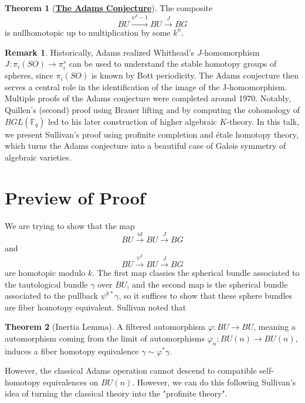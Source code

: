 \documentclass{article}
\theoremstyle{definition}
\newtheorem{theorem}{Theorem}[section]
\theoremstyle{definition}
\theoremstyle{definition}
\newtheorem{remark}{Remark}[theorem]
\theoremstyle{definition}
\theoremstyle{definition}
\theoremstyle{definition}
\theoremstyle{definition}
\begin{document}
	\begin{tcolorbox}[colback=red!5!white,colframe=red!30!white]
	\begin{theorem}[\underline{\textbf{The Adams Conjecture}}]
	The composite 
	\[BU\xrightarrow{\psi^k-1}BU\xrightarrow{J}BG\]
	is nullhomotopic up to multiplication by some $k^n$. 
	\end{theorem}
	\end{tcolorbox}
	
	
	\begin{tcolorbox}[colback=green!5!white,colframe=green!30!white]
	\begin{remark}
	Historically, Adams realized Whithead's $J$-homomorphism $J: \pi_i(SO)\to \pi^s_i$ can be used to understand the stable homotopy groups of spheres, since $\pi_i(SO)$ is known by Bott periodicity. The Adams conjecture then serves a central role in the identification of the image of the J-homomorphism.
	\\

	Multiple proofs of the Adams conjecture were completed around 1970. Notably, Quillen's (second) proof using Brauer lifting and by computing the cohomology of $BGL(\mathbb{F}_q)$ led to his later construction of higher algebraic $K$-theory. In this talk, we present Sullivan's proof using profinite completion and \'etale homotopy theory, which turns the Adams conjecture into a beautiful case of Galois symmetry of algebraic varieties.


	\end{remark}
	\end{tcolorbox}



\section{Preview of Proof}

We are trying to show that the map
\[BU\xrightarrow{id} BU\xrightarrow{J}BG\]
and 
\[BU\xrightarrow{\psi^k} BU\xrightarrow{J}BG\]
are homotopic modulo $k$. The first map classies the spherical bundle associated to the tautological bundle $\gamma$ over $BU$, and the second map is the spherical bundle associated to the pullback $\psi^{k*}\gamma$, so it suffices to show that these sphere bundles are fiber homotopy equivalent. Sullivan noted that 


\begin{tcolorbox}[colback=red!5!white,colframe=red!30!white]
\begin{theorem}[Inertia Lemma]
A filtered automorphism $\varphi: BU\to BU$, meaning a automorphism coming from the limit of automorphisms $\varphi_n:BU(n)\to BU(n)$, induces a fiber homotopy equivalence $\gamma\sim \varphi^* \gamma$. 
\end{theorem}
\end{tcolorbox}
However, the classical Adams operation cannot descend to compatible self-homotopy equivalences on $BU(n)$. However, we can do this following Sullivan's idea of turning the classical theory into the "profinite theory".
\end{document}
